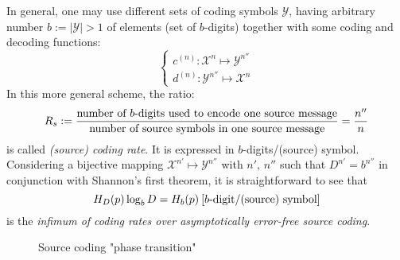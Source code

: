\documentclass{../cs-classes/cs-classes}
\newcommand*{\X}{\mathcal{X}}
\begin{document}
\begin{remark}
    In general, one may use different sets of coding symbols $\mathcal{Y}$, having arbitrary number $b:=|\mathcal{Y}|>1$ of elements (set of $b$-digits) together with some coding and decoding functions:
    \begin{equation*}
        \begin{cases}
            c^{(n)}:\X^n\mapsto \mathcal{Y}^{n''}\\
            d^{(n)}:\mathcal{Y}^{n''}\mapsto \X^n
        \end{cases}
    \end{equation*}
    In this more general scheme, the ratio:
    \begin{equation}
        R_s:=\frac{\textnormal{number of $b$-digits used to encode one source message}}{\textnormal{number of source symbols in one source message}} = \frac{n''}{n}
    \end{equation}
    is called \emph{(source) coding rate}. It is expressed in $b$-digits/(source) symbol. Considering a bijective mapping $\X^{n'}\mapsto \mathcal{Y}^{n''}$ with $n'$, $n''$ such that $D^{n'}=b^{n''}$ in conjunction with Shannon's first theorem, it is straightforward to see that
    \begin{equation*}
        H_D(p)\log_bD = H_b(p) \: \textnormal{[$b$-digit/(source) symbol]}
    \end{equation*}
    is the \emph{infimum of coding rates over asymptotically error-free source coding}.
    \begin{figure}[!ht]
        \center
        \caption{Source coding "phase transition"}
    \end{figure}
\end{remark}
\end{document}
